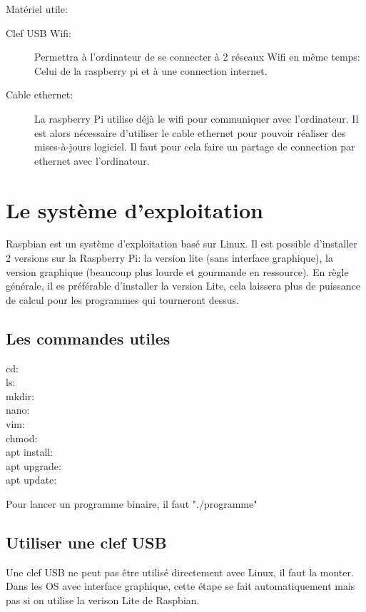 \documentclass[a4paper, 11pt]{report}
\begin{document}
Matériel utile:
\begin{description}
\item[Clef USB Wifi:]Permettra à l'ordinateur de se connecter à 2 réseaux Wifi en même temps: Celui de la raspberry pi et à une connection internet.
\item[Cable ethernet:]La raspberry Pi utilise déjà le wifi pour communiquer avec l'ordinateur. Il est alors nécessaire d'utiliser le cable ethernet pour pouvoir réaliser des mises-à-jours logiciel. Il faut pour cela faire un partage de connection par ethernet avec l'ordinateur.
\end{description}


\section{Le système d'exploitation}
Raspbian est un système d'exploitation basé sur Linux. Il est possible d'installer 2 versions sur la Raspberry Pi: la version lite (sans interface graphique), la version graphique (beaucoup plus lourde et gourmande en ressource). En règle générale, il es préférable d'installer la version Lite, cela laissera plus de puissance de calcul pour les programmes qui tourneront dessus.

\subsection{Les commandes utiles}
\begin{description}
\item[cd:]
\item[ls:]
\item[mkdir:]
\item[nano:]
\item[vim:]
\item[chmod:]
\item[apt install:]
\item[apt upgrade:]
\item[apt update:]
\end{description}

Pour lancer un programme binaire, il faut "./programme"

\subsection{Utiliser une clef USB}
Une clef USB ne peut pas être utilisé directement avec Linux, il faut la monter. Dans les OS avec interface graphique, cette étape se fait automatiquement mais pas si on utilise la verison Lite de Raspbian.
\end{document}
